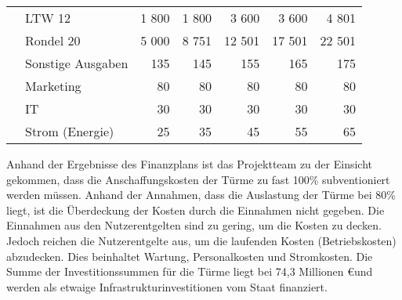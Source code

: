 \begin{table}[H]
\begin{tabular}{llrrrrr}
                                                                                 & LTW 12                      & 1 800         & 1 800         & 3 600         & 3 600         & 4 801  \\
                                                                                 & Rondel 20                   & 5 000         & 8 751         & 12 501        & 17 501        & 22 501 \\
    \midrule
                                                                                 & Sonstige Ausgaben           & 135           & 145           & 155           & 165           & 175    \\
                                                                                 & Marketing                   & 80            & 80            & 80            & 80            & 80     \\
                                                                                 & IT                          & 30            & 30            & 30            & 30            & 30     \\
                                                                                 & Strom (Energie)             & 25            & 35            & 45            & 55            & 65     \\
    \bottomrule
  \end{tabular}
\end{table}

\bigskip

\noindent Anhand der Ergebnisse des Finanzplans ist das Projektteam zu der Einsicht gekommen, dass die Anschaffungskosten der Türme zu fast 100\% subventioniert werden müssen. Anhand der Annahmen, dass die Auslastung der Türme bei 80\% liegt, ist die Überdeckung der Kosten durch die Einnahmen nicht gegeben. Die Einnahmen aus den Nutzerentgelten sind zu gering, um die Kosten zu decken. Jedoch reichen die Nutzerentgelte aus, um die laufenden Kosten (Betriebskosten) abzudecken. Dies beinhaltet Wartung, Personalkosten und Stromkosten. Die Summe der Investitionssummen für die Türme liegt bei 74,3 Millionen \euro und werden als etwaige Infrastrukturinvestitionen vom Staat finanziert.
